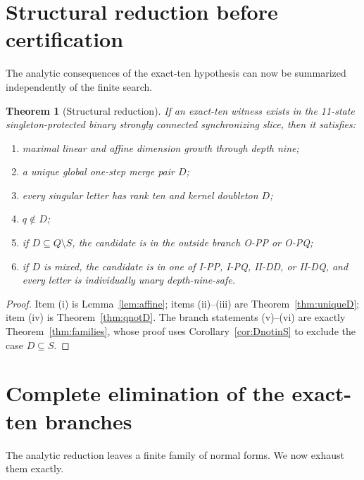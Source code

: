 \documentclass[11pt]{article}
\newtheorem{theorem}{Theorem}
\theoremstyle{definition}
\theoremstyle{remark}
\begin{document}
\section{Structural reduction before certification}
The analytic consequences of the exact-ten hypothesis can now be summarized independently of the finite search.

\begin{theorem}[Structural reduction]\label{thm:reduction}
If an exact-ten witness exists in the 11-state singleton-protected binary strongly connected synchronizing slice, then it satisfies:
\begin{enumerate}[label=(\roman*)]
\item maximal linear and affine dimension growth through depth nine;
\item a unique global one-step merge pair $D$;
\item every singular letter has rank ten and kernel doubleton $D$;
\item $q\notin D$;
\item if $D\subseteq Q\setminus S$, the candidate is in the outside branch O-PP or O-PQ;
\item if $D$ is mixed, the candidate is in one of I-PP, I-PQ, II-DD, or II-DQ, and every letter is individually unary depth-nine-safe.
\end{enumerate}
\end{theorem}
\begin{proof}
Item (i) is Lemma~\ref{lem:affine}; items (ii)--(iii) are Theorem~\ref{thm:uniqueD}; item (iv) is Theorem~\ref{thm:qnotD}. The branch statements (v)--(vi) are exactly Theorem~\ref{thm:families}, whose proof uses Corollary~\ref{cor:DnotinS} to exclude the case $D\subseteq S$.
\end{proof}

\section{Complete elimination of the exact-ten branches}
The analytic reduction leaves a finite family of normal forms. We now exhaust them exactly.
\end{document}
